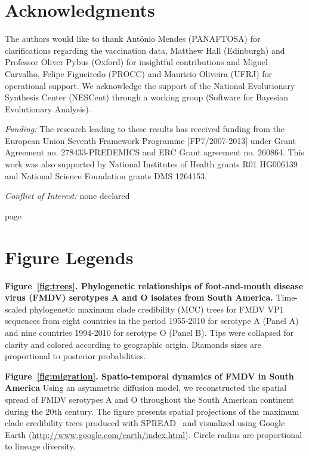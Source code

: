\documentclass[10pt]{article}
\begin{document}
\section*{Acknowledgments}
The authors would like to thank Ant\^onio Mendes (PANAFTOSA) for clarifications regarding the vaccination data, Matthew Hall (Edinburgh) and Professor Oliver Pybus (Oxford) for insightful contributions and Miguel Carvalho, Felipe Figueiredo (PROCC) and Mauricio Oliveira (UFRJ) for operational support.
We acknowledge the support of the National Evolutionary Synthesis Center (NESCent) through a working group (Software for Bayesian Evolutionary Analysis).

\emph{Funding:} The research leading to these results has received funding from the European Union Seventh Framework Programme [FP7/2007-2013] under Grant Agreement no. 278433-PREDEMICS and ERC Grant agreement no. 260864.
This work was also supported by National Institutes of Health grants R01 HG006139 and National Science Foundation grants DMS 1264153.

\emph{Conflict of Interest:} none declared

\newpage

\new page
\section*{Figure Legends}

{\bf Figure~\ref{fig:trees}. Phylogenetic relationships of foot-and-mouth disease virus (FMDV) serotypes A and O isolates from South America.} Time-scaled phylogenetic maximum clade credibility (MCC) trees for FMDV VP1 sequences from eight countries in the period 1955-2010 for serotype A (Panel A) and nine countries 1994-2010 for serotype O (Panel B).
Tips were collapsed for clarity and colored according to geographic origin.
Diamonds sizes are proportional to posterior probabilities.

{\bf Figure~\ref{fig:migration}. Spatio-temporal dynamics of FMDV in South America} Using an asymmetric diffusion model, we reconstructed the spatial spread of FMDV serotypes A and O throughout the South American continent during the 20th century.
The figure presents spatial projections of the maximum clade credibility trees produced with SPREAD~\cite{spread} and visualized using Google Earth (\url{http://www.google.com/earth/index.html}).
Circle radius are proportional to lineage diversity.
\end{document}
